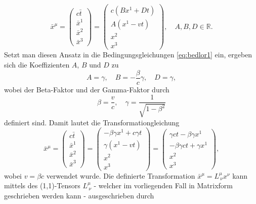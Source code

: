 \documentclass[a4paper,12pt]{article}
\numberwithin{equation}{section}
\begin{document}
\begin{equation}
\bar{x}^\mu = \begin{pmatrix}
c \bar{t} \, \\ \bar{x}^1 \\ \bar{x}^2 \\ \bar{x}^3
\end{pmatrix} = \begin{pmatrix}
c (Bx^1 +  Dt) \\ A(x^1-vt) \\ x^2 \\ x^3
\end{pmatrix}, \quad A,B,D \in \mathbb{R}.
\end{equation} Setzt man diesen Ansatz in die Bedingungsgleichungen \eqref{eq:bedlor1} ein, ergeben sich die Koeffizienten $A$, $B$ und $D$ zu \begin{equation}
A = \gamma, \quad B = -\frac{\beta}{c}\gamma, \quad D = \gamma,\end{equation} wobei der Beta-Faktor und der Gamma-Faktor durch \begin{equation} \beta = \frac{v}{c}, \quad \gamma = \frac{1}{\sqrt{1-\beta^2}}
\end{equation} definiert sind. Damit lautet die Transformationgleichung \begin{equation}
\bar{x}^\mu = \begin{pmatrix}
c \bar{t}\, \\ \bar{x}^1 \\ \bar{x}^2 \\ \bar{x}^3
\end{pmatrix} = \begin{pmatrix}
-\beta \gamma x^1 + c \gamma t \\ \gamma (x^1-vt) \\ x^2 \\ x^3
\end{pmatrix} = \begin{pmatrix}
\gamma c t - \beta \gamma x^1 \\ -\beta \gamma c t + \gamma x^1 \\ x^2 \\ x^3
\end{pmatrix},
\end{equation} wobei $v = \beta c $ verwendet wurde. Die definierte Transformation $\bar{x}^\mu = L^\mu_{\ \nu} x^\nu$ kann mittels des (1,1)-Tensors $L^\mu_{\ \nu}$ - welcher im vorliegenden Fall in Matrixform geschrieben werden kann - ausgeschrieben durch \begin{equation}

\end{equation}
\end{document}

